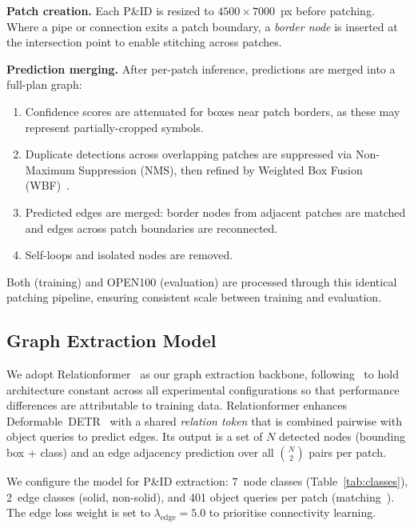 \noindent\textbf{Patch creation.}
Each P\&ID is resized to $4500\times7000$~px before patching.
Where a pipe or connection exits a patch boundary, a \emph{border node}
is inserted at the intersection point to enable stitching across patches.

\noindent\textbf{Prediction merging.}
After per-patch inference, predictions are merged into a full-plan graph:
\begin{enumerate}[noitemsep, topsep=2pt, leftmargin=1.3em]
    \item Confidence scores are attenuated for boxes near patch borders,
          as these may represent partially-cropped symbols.
    \item Duplicate detections across overlapping patches are suppressed
          via Non-Maximum Suppression (NMS), then refined by
          Weighted Box Fusion (WBF)~\cite{solovyev2021}.
    \item Predicted edges are merged: border nodes from adjacent patches
          are matched and edges across patch boundaries are reconnected.
    \item Self-loops and isolated nodes are removed.
\end{enumerate}

Both \ours{} (training) and OPEN100 (evaluation) are processed through
this identical patching pipeline, ensuring consistent scale between
training and evaluation.

\subsection{Graph Extraction Model}
\label{sec:method:model}

We adopt Relationformer~\cite{shit2022} as our graph extraction backbone,
following~\cite{sturmer2025} to hold architecture constant across all
experimental configurations so that performance differences are
attributable to training data.
Relationformer enhances Deformable~DETR~\cite{zhu2021} with a shared
\emph{relation token} that is combined pairwise with object queries to
predict edges.
Its output is a set of $N$ detected nodes (bounding box + class) and
an edge adjacency prediction over all $\binom{N}{2}$ pairs per patch.

We configure the model for P\&ID extraction: 7~node classes
(Table~\ref{tab:classes}), 2~edge classes (solid, non-solid), and 401
object queries per patch (matching~\cite{sturmer2025}).
The edge loss weight is set to $\lambda_\text{edge}=5.0$ to prioritise
connectivity learning.

